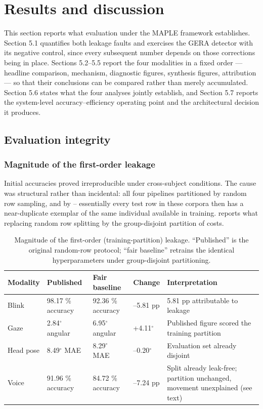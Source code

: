 \FloatBarrier

\section{Results and discussion}

This section reports what evaluation under the MAPLE framework establishes. Section 5.1 quantifies both leakage faults and exercises the GERA detector with its negative control, since every subsequent number depends on those corrections being in place. Sections 5.2--5.5 report the four modalities in a fixed order --- headline comparison, mechanism, diagnostic figures, synthesis figures, attribution --- so that their conclusions can be compared rather than merely accumulated. Section 5.6 states what the four analyses jointly establish, and Section 5.7 reports the system-level accuracy--efficiency operating point and the architectural decision it produces.

\FloatBarrier

\subsection{Evaluation integrity}

\subsubsection{Magnitude of the first-order leakage}

Initial accuracies proved irreproducible under cross-subject conditions. The cause was structural rather than incidental: all four pipelines partitioned by random row sampling, and by -- essentially every test row in these corpora then has a near-duplicate exemplar of the same individual available in training.  reports what replacing random row splitting by the group-disjoint partition of  costs.

\begin{table}[pos=htbp]
\centering
\caption{Magnitude of the first-order (training-partition) leakage. ``Published'' is the original random-row protocol; ``fair baseline'' retrains the identical hyperparameters under group-disjoint partitioning.}
\label{tab:9}
\footnotesize
\begin{tabularx}{\textwidth}{XXXXX}
\toprule
\textbf{Modality} & \textbf{Published} & \textbf{Fair baseline} & \textbf{Change} & \textbf{Interpretation} \\
\midrule
Blink & 98.17 \% accuracy & 92.36 \% accuracy & --5.81 pp & 5.81 pp attributable to leakage \\
Gaze & 2.84$^{\circ}$ angular & 6.95$^{\circ}$ angular & +4.11$^{\circ}$ & Published figure scored the training partition \\
Head pose & 8.49$^{\circ}$ MAE & 8.29$^{\circ}$ MAE & --0.20$^{\circ}$ & Evaluation set already disjoint \\
Voice & 91.96 \% accuracy & 84.72 \% accuracy & --7.24 pp & Split already leak-free; partition unchanged, movement unexplained (see text) \\
\bottomrule
\end{tabularx}
\end{table}

